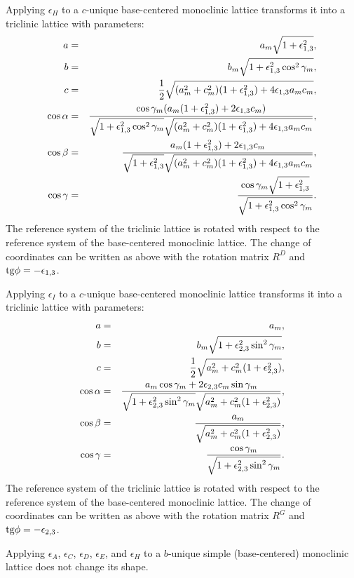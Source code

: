 \documentclass[12pt,a4paper]{article}
\begin{document}
Applying $\epsilon_H$ to a $c$-unique base-centered monoclinic lattice 
transforms it into a triclinic lattice with parameters:
\begin{eqnarray}
a&=&a_m \sqrt{1+\epsilon_{1,3}^2}, \\
b&=&b_m \sqrt{1+\epsilon_{1,3}^2 \cos^2\gamma_m}, \\
c&=&{1\over 2} \sqrt{(a_m^2+c_m^2)(1+\epsilon_{1,3}^2)+4\epsilon_{1,3}a_mc_m},\\
\cos\alpha &=& {\cos\gamma_m (a_m (1+\epsilon_{1,3}^2)+2\epsilon_{1,3}c_m) 
\over 
\sqrt{1+\epsilon_{1,3}^2 \cos^2\gamma_m} \sqrt{(a_m^2+c_m^2)(1+\epsilon_{1,3}^2)+4\epsilon_{1,3}a_mc_m}}, \\
\cos\beta &=& {a_m (1+\epsilon_{1,3}^2)+2\epsilon_{1,3}c_m 
\over 
\sqrt{1+\epsilon_{1,3}^2} \sqrt{(a_m^2+c_m^2)(1+\epsilon_{1,3}^2)+4\epsilon_{1,3}a_mc_m}}, \\
\cos\gamma &=& {\cos\gamma_m \sqrt{1+\epsilon_{1,3}^2} \over
\sqrt{1+\epsilon_{1,3}^2 \cos^2\gamma_m}}.
\end{eqnarray}
The reference system of the triclinic lattice is rotated 
with respect to the reference system of the base-centered
monoclinic lattice. 
The change of coordinates can be written as above with the rotation matrix 
$R^D$ and ${\rm tg}\phi=-\epsilon_{1,3}$.

Applying $\epsilon_I$ to a $c$-unique base-centered monoclinic lattice 
transforms it into a triclinic lattice with parameters:
\begin{eqnarray}
a&=&a_m, \\
b&=&b_m \sqrt{1+\epsilon_{2,3}^2 \sin^2\gamma_m}, \\
c&=&{1\over 2} \sqrt{a_m^2+c_m^2(1+\epsilon_{2,3}^2)},\\
\cos\alpha &=& {a_m\cos\gamma_m +2\epsilon_{2,3}c_m \sin \gamma_m 
\over 
\sqrt{1+\epsilon_{2,3}^2 \sin^2\gamma_m} 
\sqrt{a_m^2+c_m^2(1+\epsilon_{2,3}^2)}}, \\
\cos\beta &=& {a_m  
\over 
\sqrt{a_m^2+c_m^2(1+\epsilon_{2,3}^2)}}, \\
\cos\gamma &=& {\cos\gamma_m \over
\sqrt{1+\epsilon_{2,3}^2 \sin^2\gamma_m}}.
\end{eqnarray}
The reference system of the triclinic lattice is rotated 
with respect to the reference system of the base-centered
monoclinic lattice. 
The change of coordinates can be written as above with the rotation matrix 
$R^G$ and ${\rm tg}\phi=-\epsilon_{2,3}$.

Applying $\epsilon_A$, $\epsilon_C$, $\epsilon_D$, $\epsilon_E$, and
$\epsilon_H$ to a $b$-unique simple (base-centered) monoclinic lattice
does not change its shape.
\end{document}
